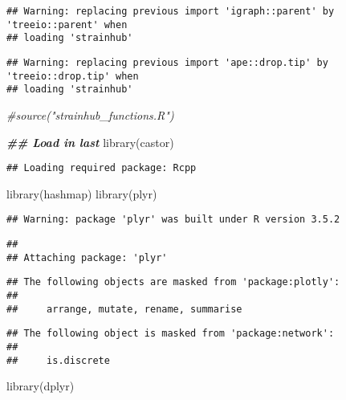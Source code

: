 \documentclass[
]{article}
\newenvironment{Shaded}{\begin{snugshade}}{\end{snugshade}}
\newcommand{\CommentTok}[1]{\textcolor[rgb]{0.56,0.35,0.01}{\textit{#1}}}
\newcommand{\DocumentationTok}[1]{\textcolor[rgb]{0.56,0.35,0.01}{\textbf{\textit{#1}}}}
\newcommand{\FunctionTok}[1]{\textcolor[rgb]{0.00,0.00,0.00}{#1}}
\newcommand{\NormalTok}[1]{#1}
\begin{document}
\begin{verbatim}
## Warning: replacing previous import 'igraph::parent' by 'treeio::parent' when
## loading 'strainhub'
\end{verbatim}

\begin{verbatim}
## Warning: replacing previous import 'ape::drop.tip' by 'treeio::drop.tip' when
## loading 'strainhub'
\end{verbatim}

\begin{Shaded}
\begin{Highlighting}[]
\CommentTok{\#source("strainhub\_functions.R")}

\DocumentationTok{\#\# Load in last}
\FunctionTok{library}\NormalTok{(castor)}
\end{Highlighting}
\end{Shaded}

\begin{verbatim}
## Loading required package: Rcpp
\end{verbatim}

\begin{Shaded}
\begin{Highlighting}[]
\FunctionTok{library}\NormalTok{(hashmap)}
\FunctionTok{library}\NormalTok{(plyr)}
\end{Highlighting}
\end{Shaded}

\begin{verbatim}
## Warning: package 'plyr' was built under R version 3.5.2
\end{verbatim}

\begin{verbatim}
## 
## Attaching package: 'plyr'
\end{verbatim}

\begin{verbatim}
## The following objects are masked from 'package:plotly':
## 
##     arrange, mutate, rename, summarise
\end{verbatim}

\begin{verbatim}
## The following object is masked from 'package:network':
## 
##     is.discrete
\end{verbatim}

\begin{Shaded}
\begin{Highlighting}[]
\FunctionTok{library}\NormalTok{(dplyr)}
\end{Highlighting}
\end{Shaded}
\end{document}

